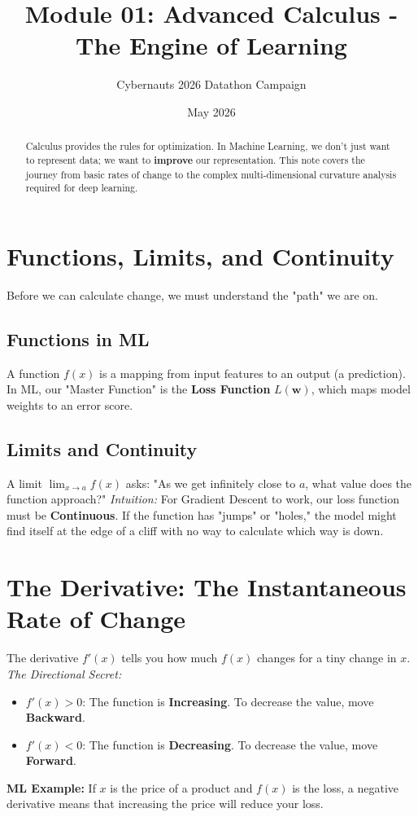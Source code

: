\documentclass{article}
\title{Module 01: Advanced Calculus - The Engine of Learning}
\author{Cybernauts 2026 Datathon Campaign}
\date{May 2026}
\begin{document}
\maketitle

\begin{abstract}
Calculus provides the rules for optimization. In Machine Learning, we don't just want to represent data; we want to \textbf{improve} our representation. This note covers the journey from basic rates of change to the complex multi-dimensional curvature analysis required for deep learning.
\end{abstract}

\tableofcontents
\newpage

\section{Functions, Limits, and Continuity}
Before we can calculate change, we must understand the "path" we are on.

\subsection{Functions in ML}
A function $f(x)$ is a mapping from input features to an output (a prediction). In ML, our "Master Function" is the \textbf{Loss Function} $L(\mathbf{w})$, which maps model weights to an error score.

\subsection{Limits and Continuity}
A limit $\lim_{x \to a} f(x)$ asks: "As we get infinitely close to $a$, what value does the function approach?"
\textit{Intuition:} For Gradient Descent to work, our loss function must be \textbf{Continuous}. If the function has "jumps" or "holes," the model might find itself at the edge of a cliff with no way to calculate which way is down.

\section{The Derivative: The Instantaneous Rate of Change}
The derivative $f'(x)$ tells you how much $f(x)$ changes for a tiny change in $x$.
\textit{The Directional Secret:}
\begin{itemize}
    \item $f'(x) > 0$: The function is \textbf{Increasing}. To decrease the value, move \textbf{Backward}.
    \item $f'(x) < 0$: The function is \textbf{Decreasing}. To decrease the value, move \textbf{Forward}.
\end{itemize}
\textbf{ML Example:} If $x$ is the price of a product and $f(x)$ is the loss, a negative derivative means that increasing the price will reduce your loss.
\end{document}
